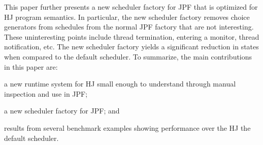 This paper further presents a new scheduler factory for JPF that is optimized for HJ program semantics. 
%
In particular, the new scheduler factory removes choice generators
from schedules from the normal JPF factory that are not
interesting. These uninteresting points include thread termination, entering a monitor, thread notification, etc.
% 
The new scheduler factory yields a significant reduction in states when compared to the default scheduler. 
To summarize, the main contributions in this paper are:
\begin{compactitem}
\item a new runtime system for HJ small enough to understand through manual inspection and use in JPF; 
\item a new scheduler factory for JPF; and
\item results from several benchmark examples showing performance over the HJ the default scheduler.
\end{compactitem}

\begin{comment}
The rapid shift to multicore platforms is leading to a programming
crisis. 
%
A typical programmer is not able to exploit the additional
computation resources because there is no obvious good programming paradigm for concurrency.
%
Languages are either exceptionally low level requiring an expert in concurrency or are too abstract to perform adequately on the hardware.
%
Bugs in concurrent programs are also especially pernicious and hard to reproduce.
%
Unintended (and unexpected) interactions between concurrent elements are usually dependent on external runtime systems outside the control of the developer.

As a result, it is inherently difficult (or impossible) to obtain any
guarantee on test coverage, and if a test fails, it may fail
non-deterministically making debugging equally impossible.
\end{comment}
